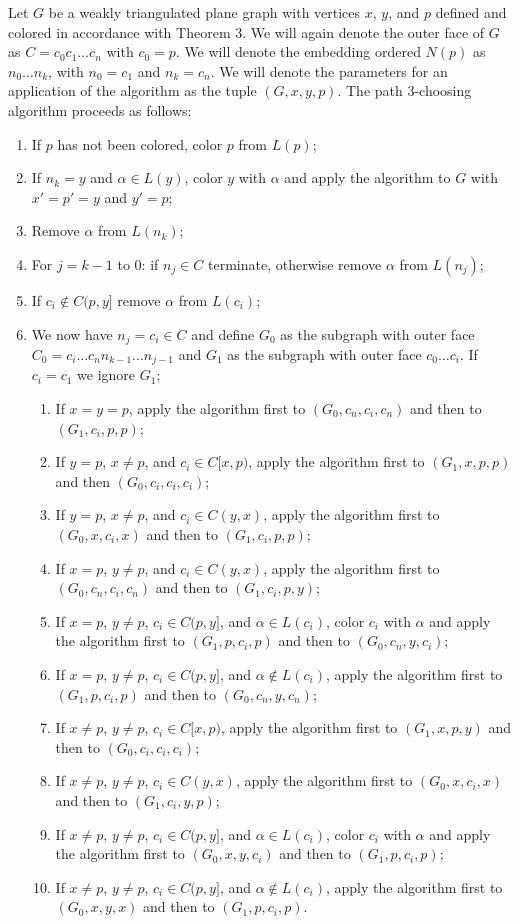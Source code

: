 \documentclass[11pt,letter]{article}
\begin{document}
\noindent Let $G$ be a weakly triangulated plane graph with vertices $x$, $y$, and $p$ defined and
colored in accordance with Theorem 3. We will again denote the outer face of $G$ as
$C=c_0c_1\ldots c_n$ with $c_0=p$.
We will denote the embedding ordered $N(p)$ as $n_0\ldots n_k$, with $n_0=c_1$ and
$n_k=c_n$. We will denote the parameters for an application of the algorithm as the tuple $(G, x, y, p)$.
The path $3$-choosing algorithm proceeds as follows:

\begin{enumerate}
\item If $p$ has not been colored, color $p$ from $L(p)$;
\item If $n_k=y$ and $\alpha\in L(y)$, color $y$ with $\alpha$ and apply the algorithm to $G$ with $x'=p'=y$ and
$y'=p$;
\item Remove $\alpha$ from $L(n_k)$;
\item For $j=k-1$ to $0$: if $n_j\in C$ terminate, otherwise remove $\alpha$ from $L(n_j)$;
\item If $c_i\not\in C(p,y]$ remove $\alpha$ from $L(c_i)$;
\item We now have $n_j=c_i\in C$ and define $G_0$ as the subgraph with outer face
$C_0=c_i\ldots c_nn_{k-1}\ldots n_{j-1}$ and $G_1$ as the subgraph with outer face $c_0\ldots c_i$. If $c_i=c_1$
we ignore $G_1$;
\begin{enumerate}
\item If $x=y=p$, apply the algorithm first to $(G_0, c_n, c_i, c_n)$ and then to $(G_1, c_i, p, p)$;
\item If $y=p$, $x\ne p$, and $c_i\in C[x,p)$, apply the algorithm first to $(G_1, x, p, p)$ and then
$(G_0, c_i, c_i, c_i)$;
\item If $y=p$, $x\ne p$, and $c_i\in C(y,x)$, apply the algorithm first to $(G_0, x, c_i, x)$ and then to $(G_1, c_i, p, p)$;
\item If $x=p$, $y\ne p$, and $c_i\in C(y,x)$, apply the algorithm first to $(G_0, c_n, c_i, c_n)$ and then to $(G_1, c_i, p, y)$;
\item If $x=p$, $y\ne p$, $c_i\in C(p,y]$, and $\alpha\in L(c_i)$, color $c_i$ with $\alpha$ and apply the
algorithm first to $(G_1, p, c_i, p)$ and then to $(G_0, c_n, y, c_i)$;
\item If $x=p$, $y\ne p$, $c_i\in C(p,y]$, and $\alpha\not\in L(c_i)$, apply the
algorithm first to $(G_1, p, c_i, p)$ and then to $(G_0, c_n, y, c_n)$;
\item If $x\ne p$, $y\ne p$, $c_i\in C[x,p)$, apply the algorithm first to $(G_1, x, p, y)$ and then to
$(G_0, c_i, c_i, c_i)$;
\item If $x\ne p$, $y\ne p$, $c_i\in C(y,x)$, apply the algorithm first to $(G_0, x, c_i, x)$ and then to
$(G_1, c_i, y, p)$;
\item If $x\ne p$, $y\ne p$, $c_i\in C(p,y]$, and $\alpha\in L(c_i)$, color $c_i$ with $\alpha$ and apply the
algorithm first to $(G_0, x, y, c_i)$ and then to $(G_1, p, c_i, p)$;
\item If $x\ne p$, $y\ne p$, $c_i\in C(p,y]$, and $\alpha\not\in L(c_i)$, apply the
algorithm first to $(G_0, x, y, x)$ and then to $(G_1, p, c_i, p)$.
\end{enumerate}
\end{enumerate}
\end{document}
